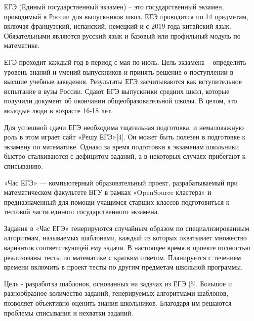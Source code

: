 ЕГЭ (Единый государственный экзамен) – это государственный экзамен, проводимый в России для выпускников школ. ЕГЭ проводится по 14 предметам, включая французский, испанский, немецкий и с 2019 года китайский язык. Обязательными являются русский язык и базовый или профильный модуль по математике.

ЕГЭ проходит каждый год в период с мая по июль. Цель экзамена – определить уровень знаний и умений выпускников и принять решение о поступлении в высшие учебные заведения. Результаты ЕГЭ засчитываются как вступительное испытание в вузы России. Сдают ЕГЭ выпускники средних школ, которые получили документ об окончании общеобразовательной школы. В целом, это молодые люди в возрасте 16-18 лет.

Для успешной сдачи ЕГЭ необходима тщательная подготовка, и немаловажную роль в этом играет сайт «Решу ЕГЭ»[4]. Он может быть полезен в подготовке к экзамену по математике. Однако за время подготовки к экзаменам школьники быстро сталкиваются с дефицитом заданий, а в некоторых случаях прибегают к списыванию.

«Час ЕГЭ» — компьютерный образовательный проект, разрабатываемый при математическом факультете ВГУ в рамках «OpenSource кластера» и предназначенный для помощи учащимся старших классов подготовиться к тестовой части единого государственного экзамена.

Задания в «Час ЕГЭ» генерируются случайным образом по специализированным алгоритмам, называемых шаблонами, каждый из которых охватывает множество вариантов соответствующей ему задачи. В настоящее время в проекте полностью реализованы тесты по математике с кратким ответом. Планируется с течением времени включить в проект тесты по другим предметам школьной программы. 

Цель - разработка шаблонов, основанных на задачах из ЕГЭ [5]. Большое и разнообразное количество заданий, генерируемых алгоритмами шаблонов, позволяет объективно оценить знания школьников. Благодаря им решаются проблемы списывания и нехватки заданий.
